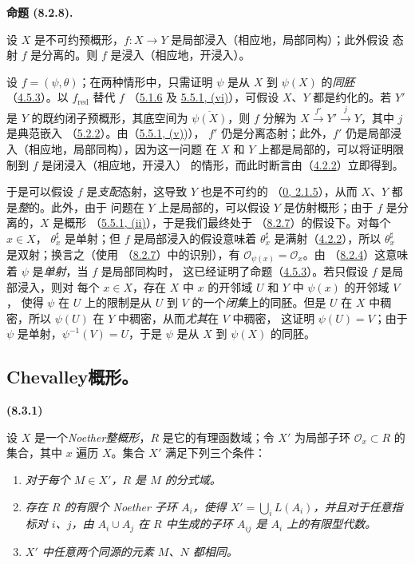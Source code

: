 \documentclass[UTF8,fontset=none,11pt,oneside,openany]{ctexbook}
\newenvironment{env}[1][]{%
  \par\medskip\noindent\textbf{(#1)}\ %
}{\par}
\newenvironment{proposition}[1][]{%
  \par\medskip\noindent\textbf{命题 (#1).}\ %
}{\par}
\newcommand{\oldpage}[2][]{%
  \hypertarget{ega-source-page-#1-#2}{}%
  \marginnote{\scriptsize\textbf{#1}~|~#2}\ignorespaces}
\let\EGAOriginalLabel\label
\renewcommand{\label}[1]{\phantomsection\EGAOriginalLabel{#1}}
\begin{document}
\begin{proposition}[8.2.8]
\label{I.8.2.8-fr}
设 $X$ 是不可约预概形，$f:X\to Y$ 是局部浸入（相应地，局部同构）；此外假设
态射 $f$ 是分离的。则 $f$ 是浸入（相应地，开浸入）。
\end{proposition}

设 $f=(\psi,\theta)$；在两种情形中，只需证明 $\psi$ 是从 $X$ 到
$\psi(X)$ 的\emph{同胚}
（\hyperref[I.4.5.3-fr]{4.5.3}）。以 $f_{\mathrm{red}}$ 替代 $f$
（\hyperref[I.5.1.6-fr]{5.1.6} 及
\hyperref[I.5.5.1-fr]{5.5.1, (vi)}），可假设 $X$、$Y$ 都是约化的。若 $Y'$
是 $Y$ 的既约闭子预概形，其底空间为 $\overline{\psi(X)}$，则 $f$ 分解为
$X\xrightarrow{f'}Y'\xrightarrow{j}Y$，其中 $j$ 是典范嵌入
（\hyperref[I.5.2.2-fr]{5.2.2}）。由（\hyperref[I.5.5.1-fr]{5.5.1, (v)})），
$f'$ 仍是分离态射；此外，$f'$ 仍是局部浸入（相应地，局部同构），因为这一问题
在 $X$ 和 $Y$ 上都是局部的，可以将证明限制到 $f$ 是闭浸入（相应地，开浸入）
的情形，而此时断言由（\hyperref[I.4.2.2-fr]{4.2.2}）立即得到。

\oldpage[I]{168}
于是可以假设 $f$ 是\emph{支配}态射，这导致 $Y$ 也是不可约的
（\hyperref[0.2.1.5-fr]{0, 2.1.5}），从而 $X$、$Y$ 都是\emph{整}的。此外，由于
问题在 $Y$ 上是局部的，可以假设 $Y$ 是仿射概形；由于 $f$ 是分离的，$X$ 是概形
（\hyperref[I.5.5.1-fr]{5.5.1, (ii)}），于是我们最终处于
（\hyperref[I.8.2.7-fr]{8.2.7}）的假设下。对每个 $x\in X$，
$\theta_x^\sharp$ 是单射；但 $f$ 是局部浸入的假设意味着
$\theta_x^\sharp$ 是满射（\hyperref[I.4.2.2-fr]{4.2.2}），所以
$\theta_x^\sharp$ 是双射；换言之（使用
（\hyperref[I.8.2.7-fr]{8.2.7}）中的识别），有
$\mathscr{O}_{\psi(x)}=\mathscr{O}_x$。由
（\hyperref[I.8.2.4-fr]{8.2.4}）这意味着 $\psi$ 是\emph{单射}，当 $f$ 是局部同构时，
这已经证明了命题（\hyperref[I.4.5.3-fr]{4.5.3}）。若只假设 $f$ 是局部浸入，则对
每个 $x\in X$，存在 $X$ 中 $x$ 的开邻域 $U$ 和 $Y$ 中 $\psi(x)$ 的开邻域 $V$，
使得 $\psi$ 在 $U$ 上的限制是从 $U$ 到 $V$ 的一个\emph{闭集}上的同胚。但是
$U$ 在 $X$ 中稠密，所以 $\psi(U)$ 在 $Y$ 中稠密，从而\emph{尤其}在 $V$ 中稠密，
这证明 $\psi(U)=V$；由于 $\psi$ 是单射，$\psi^{-1}(V)=U$，于是 $\psi$ 是从
$X$ 到 $\psi(X)$ 的同胚。

\subsection{Chevalley概形。}
\label{subsection:I.8.3-fr}

\begin{env}[8.3.1]
\label{I.8.3.1-fr}
设 $X$ 是一个\emph{Noether整概形}，$R$ 是它的有理函数域；令 $X'$ 为局部子环
$\mathscr{O}_x\subset R$ 的集合，其中 $x$ 遍历 $X$。集合 $X'$ 满足下列三个条件：
\begin{enumerate}
  \item[(Sch. 1)] \emph{对于每个 $M\in X'$，$R$ 是 $M$ 的分式域。}
  \item[(Sch. 2)] \emph{存在 $R$ 的有限个 Noether 子环 $A_i$，使得
    $X'=\bigcup_i L(A_i)$，并且对于任意指标对 $i$、$j$，由
    $A_i\cup A_j$ 在 $R$ 中生成的子环 $A_{ij}$ 是 $A_i$ 上的有限型代数。}
  \item[(Sch. 3)] \emph{$X'$ 中任意两个同源的元素 $M$、$N$ 都相同。}
\end{enumerate}
\end{env}
\end{document}
